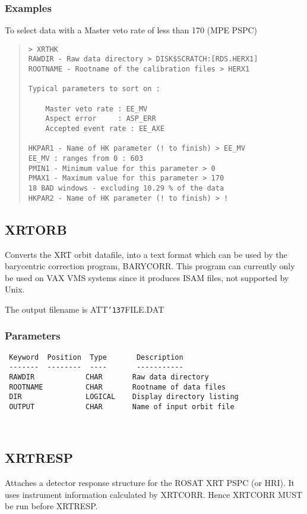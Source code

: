 \documentclass{book}
\renewcommand{\_}{{\tt\char'137}}     %
\begin{document}
\subsubsection{Examples}
To select data with a Master veto rate of less than 170 (MPE PSPC)
\begin{quote}\begin{verbatim}
> XRTHK
RAWDIR - Raw data directory > DISK$SCRATCH:[RDS.HERX1]
ROOTNAME - Rootname of the calibration files > HERX1
 
Typical parameters to sort on :
 
    Master veto rate : EE_MV
    Aspect error     : ASP_ERR
    Accepted event rate : EE_AXE
 
HKPAR1 - Name of HK parameter (! to finish) > EE_MV
EE_MV : ranges from 0 : 603
PMIN1 - Minimum value for this parameter > 0
PMAX1 - Maximum value for this parameter > 170
18 BAD windows - excluding 10.29 % of the data
HKPAR2 - Name of HK parameter (! to finish) > !
\end{verbatim}\end{quote}
\subsection{XRTORB}
Converts the XRT orbit datafile, into a text format
which can be used by the barycentric correction program, BARYCORR.
This program can currently only be used on VAX VMS systems since
it produces ISAM files, not supported by Unix.
 
The output filename is ATT\_FILE.DAT
 
\subsubsection{Parameters}
\begin{verbatim}
 Keyword  Position  Type       Description
 -------  --------  ----       -----------
 RAWDIR            CHAR       Raw data directory
 ROOTNAME          CHAR       Rootname of data files
 DIR               LOGICAL    Display directory listing
 OUTPUT            CHAR       Name of input orbit file
                              
 
\end{verbatim}\subsection{XRTRESP}
Attaches a detector response structure for the ROSAT XRT
PSPC (or HRI). It uses instrument information calculated by
XRTCORR. Hence XRTCORR MUST be run before XRTRESP.
 
\end{document}
